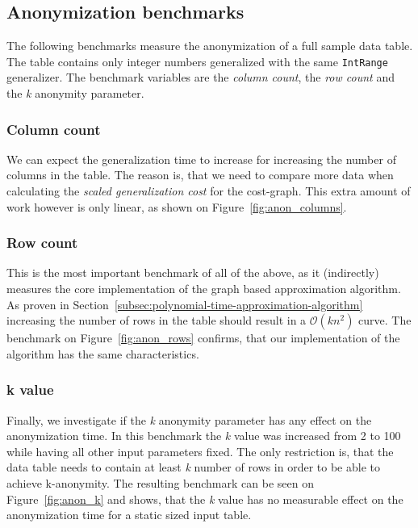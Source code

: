 \vspace{\baselineskip}


\vspace{\baselineskip}


\subsection{Anonymization benchmarks}

The following benchmarks measure the anonymization of a full sample data table. The table contains only integer numbers generalized with the same \texttt{IntRange} generalizer. The benchmark variables are the \emph{column count}, the \emph{row count} and the \emph{k} anonymity parameter.

\subsubsection{Column count}

We can expect the generalization time to increase for increasing the number of columns in the table. The reason is, that we need to compare more data when calculating the \emph{scaled generalization cost} for the cost-graph. This extra amount of work however is only linear, as shown on Figure~\ref{fig:anon_columns}.

\vspace{\baselineskip}


\subsubsection{Row count}

This is the most important benchmark of all of the above, as it (indirectly) measures the core implementation of the graph based approximation algorithm. As proven in Section~\ref{subsec:polynomial-time-approximation-algorithm} increasing the number of rows in the table should result in a \(\mathcal{O}(kn^2)\) curve. The benchmark on Figure~\ref{fig:anon_rows} confirms, that our implementation of the algorithm has the same characteristics.

\vspace{\baselineskip}


\subsubsection{k value}

Finally, we investigate if the \emph{k} anonymity parameter has any effect on the anonymization time. In this benchmark the \emph{k} value was increased from 2 to 100 while having all other input parameters fixed. The only restriction is, that the data table needs to contain at least \emph{k} number of rows in order to be able to achieve k-anonymity. The resulting benchmark can be seen on Figure~\ref{fig:anon_k} and shows, that the \emph{k} value has no measurable effect on the anonymization time for a static sized input table.

\vspace{\baselineskip}
